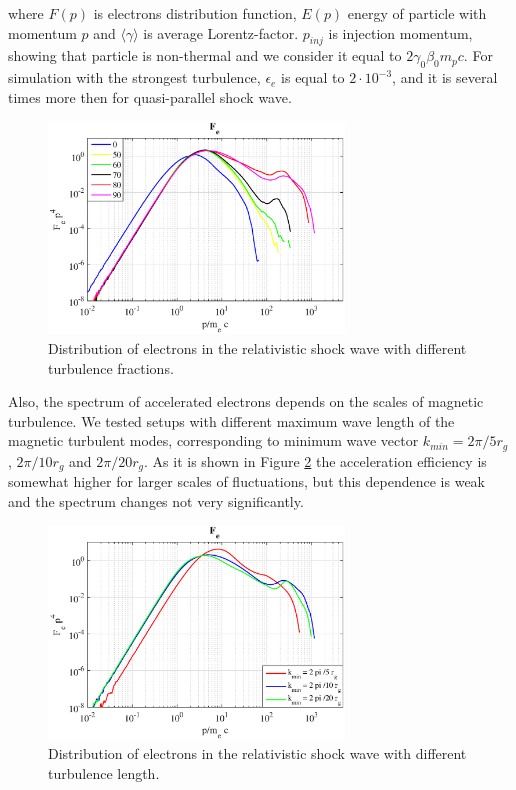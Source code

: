 \documentclass[a4paper]{jpconf}
\begin{document}
where $F(p)$ is electrons distribution function, $E(p)$ energy of particle with momentum $p$ and $\langle \gamma \rangle$ is average Lorentz-factor. $p_{inj}$ is injection momentum, showing that particle is non-thermal and we consider it equal to $2 \gamma_0 \beta_0 m_p c$. For simulation with the strongest turbulence, $\epsilon_e$ is equal to $2\cdot10^{-3}$, and it is several times more then for quasi-parallel shock wave.
\begin{figure}[h!]
	\centering
	\includegraphics[width=0.7\textwidth]{fig/spectrum.eps} 
	\caption{Distribution of electrons in the relativistic shock wave with different turbulence fractions.}
	\label{spectrum}
\end{figure} 

Also, the spectrum of accelerated electrons depends on the scales of magnetic turbulence. We tested setups with different maximum wave length of the magnetic turbulent modes, corresponding to minimum wave vector $k_{min} = 2 \pi / 5 r_g$, $2 \pi / 10 r_g$ and $ 2 \pi /20 r_g$. As it is shown in Figure \ref{spectrum_length} the acceleration efficiency is somewhat higher for larger scales of fluctuations, but this dependence is weak and the spectrum changes not very significantly.

\begin{figure}[h!]
	\centering
	\includegraphics[width=0.7\textwidth]{fig/spectrum_length.eps} 
	\caption{Distribution of electrons in the relativistic shock wave with different turbulence length.}
	\label{spectrum_length}
\end{figure} 
\end{document}
